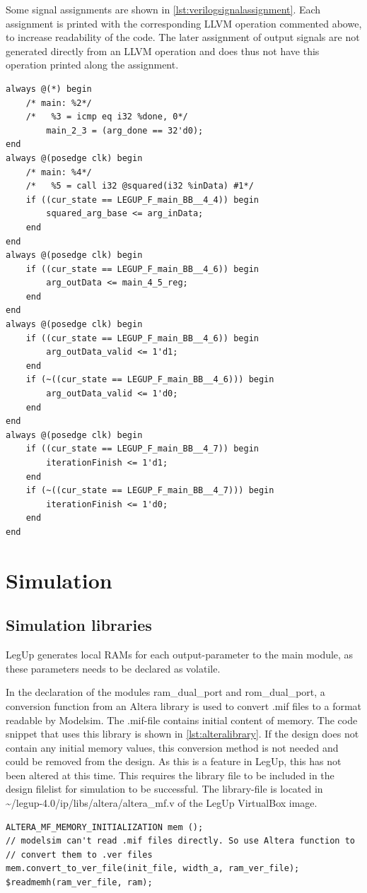 Some signal assignments are shown in \cref{lst:verilogsignalassignment}. Each assignment is printed with the corresponding LLVM operation commented abowe, to increase readability of the code. The later assignment of output signals are not generated directly from an LLVM operation and does thus not have this operation printed along the assignment.
\begin{lstlisting}[caption={Verilog FSM},label=lst:verilogsignalassignment,float]
always @(*) begin
	/* main: %2*/
	/*   %3 = icmp eq i32 %done, 0*/
		main_2_3 = (arg_done == 32'd0);
end
always @(posedge clk) begin
	/* main: %4*/
	/*   %5 = call i32 @squared(i32 %inData) #1*/
	if ((cur_state == LEGUP_F_main_BB__4_4)) begin
		squared_arg_base <= arg_inData;
	end
end
always @(posedge clk) begin
	if ((cur_state == LEGUP_F_main_BB__4_6)) begin
		arg_outData <= main_4_5_reg;
	end
end
always @(posedge clk) begin
	if ((cur_state == LEGUP_F_main_BB__4_6)) begin
		arg_outData_valid <= 1'd1;
	end
	if (~((cur_state == LEGUP_F_main_BB__4_6))) begin
		arg_outData_valid <= 1'd0;
	end
end
always @(posedge clk) begin
	if ((cur_state == LEGUP_F_main_BB__4_7)) begin
		iterationFinish <= 1'd1;
	end
	if (~((cur_state == LEGUP_F_main_BB__4_7))) begin
		iterationFinish <= 1'd0;
	end
end
\end{lstlisting}

\section{Simulation}
\subsection{Simulation libraries}

LegUp generates local RAMs for each output-parameter to the main module, as these parameters needs to be declared as volatile. 

In the declaration of the modules ram\_dual\_port and rom\_dual\_port, a conversion function from an Altera library is used to convert .mif files to a format readable by Modelsim. The .mif-file contains initial content of memory. The code snippet that uses this library is shown in \cref{lst:alteralibrary}. If the design does not contain any initial memory values, this conversion method is not needed and could be removed from the design. As this is a feature in LegUp, this has not been altered at this time. This requires the library file to be included in the design filelist for simulation to be successful. The library-file is located in \textasciitilde/legup-4.0/ip/libs/altera/altera\_mf.v of the LegUp VirtualBox image. 
\lstset{language=Verilog, style=VerilogStyle}
\begin{lstlisting}[caption={Altera Library function used for memory management},label=lst:alteralibrary]
ALTERA_MF_MEMORY_INITIALIZATION mem ();
// modelsim can't read .mif files directly. So use Altera function to
// convert them to .ver files
mem.convert_to_ver_file(init_file, width_a, ram_ver_file);
$readmemh(ram_ver_file, ram);
\end{lstlisting}

